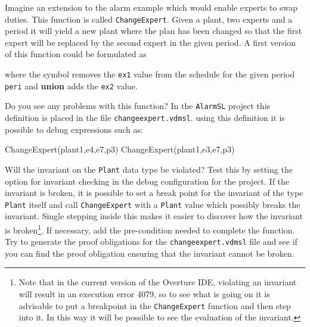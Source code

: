 \begin{myhardexercise}
\label{ex:tool-alarm} Imagine an extension to the alarm example which would enable experts to swap duties. This function is called \texttt{ChangeExpert}. Given a plant, two experts and a period it will
yield a new plant where the plan has been changed so that the first expert will be replaced by the second expert in the given period. A first version of this function could be formulated as
\begin{vdmsl}
ChangeExpert: Plant * Expert * Expert * Period -> Plant
ChangeExpert(mk_Plant(plan,alarms),ex1,ex2,peri) ==
  mk_Plant(plan ++ {peri |-> plan(peri)\{ex1} union {ex2}},
           alarms)
\end{vdmsl}
\noindent where the \texttt{\SETDIFF} symbol removes the \texttt{ex1} value from the schedule for the given period \texttt{peri} and {\bf\ttfamily union} adds the \texttt{ex2} value.

Do you see any problems with this function? In the \texttt{AlarmSL} project this definition is placed
in the file \texttt{changeexpert.vdmsl}.
using this definition it is possible to debug expressions such as:
\begin{vdmsl}
ChangeExpert(plant1,e4,e7,p3)
ChangeExpert(plant1,e3,e7,p3)
\end{vdmsl}
Will the invariant on the \texttt{Plant} data type be violated?  Test this by setting the option for invariant checking in the debug configuration for the project. If the invariant is broken, it is possible to set a break point for the invariant of the type \texttt{Plant} itself and call \texttt{ChangeExpert} with a \texttt{Plant} value which possibly breaks the invariant. Single stepping inside this makes it easier to discover how the invariant is broken\footnote{Note that in the current version of the Overture IDE, violating an invariant will result in an execution error 4079, so to see what is going on it is advisable to put a breakpoint in the \texttt{ChangeExpert} function and then step into it.  In this way it will be possible to see the evaluation of the invariant.}.  If necessary, add the pre-condition needed to complete the function. Try to generate the proof obligations for the \texttt{changeexpert.vdmsl} file and see if you can find the proof obligation ensuring that the invariant cannot be broken.
\end{myhardexercise}

